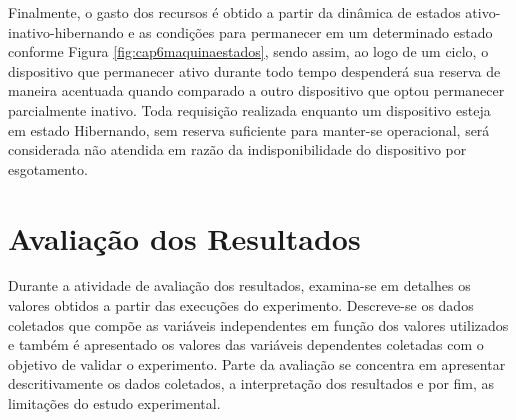 Finalmente, o gasto dos recursos é obtido a partir da dinâmica de estados ativo-inativo-hibernando e as condições para permanecer em um determinado estado conforme Figura \ref{fig:cap6maquinaestados}, sendo assim, ao logo de um ciclo, o dispositivo que permanecer ativo durante todo tempo despenderá sua reserva de maneira  acentuada quando comparado a outro dispositivo que optou permanecer parcialmente inativo. Toda requisição realizada enquanto um dispositivo esteja em estado Hibernando,  sem reserva suficiente para manter-se operacional, será considerada não atendida em razão da indisponibilidade do dispositivo por esgotamento.

\section{Avaliação dos Resultados}
\label{cap6:avaliacao}

Durante a atividade de avaliação dos resultados, examina-se em detalhes os valores obtidos a partir das execuções do experimento. Descreve-se os dados coletados que compõe as variáveis independentes em função dos valores utilizados e também é apresentado os valores das variáveis dependentes coletadas com o objetivo de validar o experimento. 
Parte da avaliação se concentra em apresentar descritivamente os dados coletados, a interpretação dos resultados e por fim, as limitações do estudo experimental.



